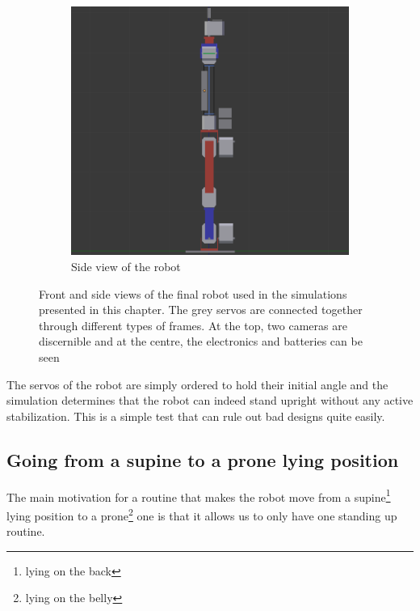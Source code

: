 \begin{figure}[htp]
\begin{subfigure}[b]{0.8\textwidth}
\center
    \includegraphics[width = \textwidth]{figures/robot_v7_side}
    \caption[]{Side view of the robot}
    \label{fig:robotv7_side}
\end{subfigure}
\caption[]{Front and side views of the final robot used in the simulations presented in this chapter. The grey servos are connected together through different types of frames. At the top, two cameras are discernible and at the centre, the electronics and batteries can be seen}
\label{fig:robotv7}
\end{figure}

The servos of the robot are simply ordered to hold their initial angle and the simulation determines that the robot can indeed stand upright without any active stabilization. This is a simple test that can rule out bad designs quite easily.

\subsection{Going from a supine to a prone lying position}
The main motivation for a routine that makes the robot move from a supine\footnote{lying on the back} lying position to a prone\footnote{lying on the belly} one is that it allows us to only have one standing up routine. 

